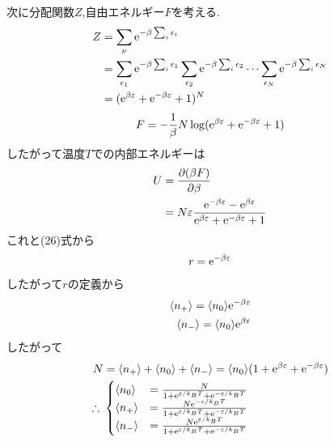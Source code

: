 次に分配関数$Z$,自由エネルギー$F$を考える.
\begin{align}
  \begin{split}
    Z&=\sum_\nu{\rm e}^{-\beta\sum_i\epsilon_i}\\
    &=\sum_{\epsilon_1}{\rm e}^{-\beta\sum_i\epsilon_1}\sum_{\epsilon_2}{\rm e}^{-\beta\sum_i\epsilon_2}\cdots\sum_{\epsilon_N}{\rm e}^{-\beta\sum_i\epsilon_N}\\
    &=({\rm e}^{\beta\varepsilon}+{\rm e}^{-\beta\varepsilon}+1)^N
  \end{split}
\end{align}
\begin{align}
  F=-\frac{1}{\beta}N\log({\rm e}^{\beta\varepsilon}+{\rm e}^{-\beta\varepsilon}+1)
\end{align}
したがって温度$T$での内部エネルギーは
\begin{align}
  \begin{split}
    U&=\frac{\partial(\beta F)}{\partial \beta}\\
    &=N\varepsilon\frac{{\rm e}^{-\beta\varepsilon}-{\rm e}^{\beta\varepsilon}}{{\rm e}^{\beta\varepsilon}+{\rm e}^{-\beta\varepsilon}+1}
  \end{split}
\end{align}
これと(26)式から
\begin{align}
  r={\rm e}^{-\beta\varepsilon}
\end{align}
したがって$r$の定義から
\begin{align}
  \begin{split}
    \langle n_+\rangle=\langle n_0\rangle{\rm e}^{-\beta\varepsilon}\\
    \langle n_-\rangle=\langle n_0\rangle{\rm e}^{\beta\varepsilon}
  \end{split}
\end{align}
したがって
\begin{align}
  \begin{split}
    N&=\langle n_+\rangle+\langle n_0\rangle+\langle n_-\rangle=\langle n_0\rangle(1+{\rm e}^{\beta\varepsilon}+{\rm e}^{-\beta\varepsilon})\\
    \therefore\ &
    \begin{cases}
      \langle n_0\rangle&=\frac{N}{1+{\rm e}^{\varepsilon/k_BT}+{\rm e}^{-\varepsilon/k_BT}}\\
      \langle n_+\rangle&=\frac{N{\rm e}^{-\varepsilon/k_BT}}{1+{\rm e}^{\varepsilon/k_BT}+{\rm e}^{-\varepsilon/k_BT}}\\
      \langle n_-\rangle&=\frac{N{\rm e}^{\varepsilon/k_BT}}{1+{\rm e}^{\varepsilon/k_BT}+{\rm e}^{-\varepsilon/k_BT}}
    \end{cases}
  \end{split}
\end{align}
